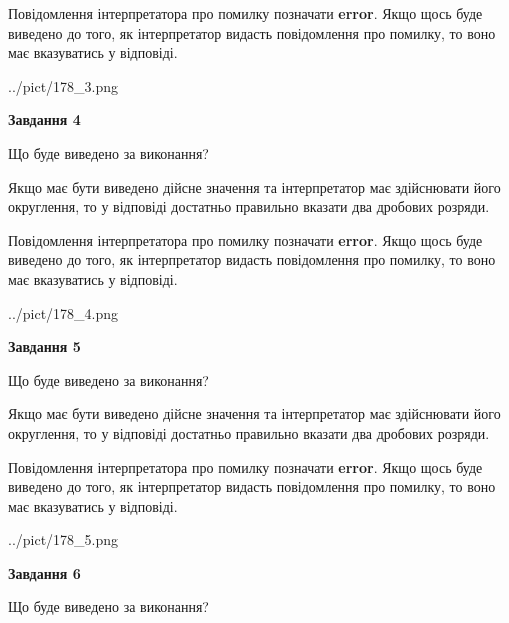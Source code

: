 \documentclass[12pt, ukrainian]{article}
\begin{document}
{\begin {Large}
Повідомлення інтерпретатора про помилку позначати \textbf{error}.
Якщо щось буде виведено до того, як інтерпретатор видасть повідомлення про помилку, 
то воно має вказуватись у відповіді. \par

\begin{center}
	{../pict/178_3.png}
\end{center}
\newpage

{\begin {center}\textbf{Завдання 4}\end {center}}\par
Що буде виведено за виконання? \par

Якщо має бути виведено дійсне значення та інтерпретатор має здійснювати його округлення, 
то у відповіді достатньо правильно вказати два дробових розряди.

Повідомлення інтерпретатора про помилку позначати \textbf{error}.
Якщо щось буде виведено до того, як інтерпретатор видасть повідомлення про помилку, 
то воно має вказуватись у відповіді. \par

\begin{center}
	{../pict/178_4.png}
\end{center}
\newpage

{\begin {center}\textbf{Завдання 5}\end {center}}\par
Що буде виведено за виконання? \par

Якщо має бути виведено дійсне значення та інтерпретатор має здійснювати його округлення, 
то у відповіді достатньо правильно вказати два дробових розряди.

Повідомлення інтерпретатора про помилку позначати \textbf{error}.
Якщо щось буде виведено до того, як інтерпретатор видасть повідомлення про помилку, 
то воно має вказуватись у відповіді. \par

\begin{center}
	{../pict/178_5.png}
\end{center}
\newpage

{\begin {center}\textbf{Завдання 6}\end {center}}\par
Що буде виведено за виконання? \par


\end{Large}}
\end{document}
